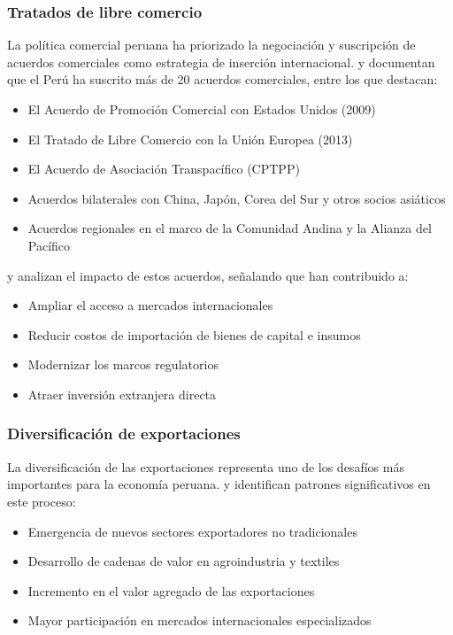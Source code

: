 \documentclass[12pt, a4paper]{article}
\begin{document}
\subsubsection{Tratados de libre comercio}
La política comercial peruana ha priorizado la negociación y suscripción de acuerdos comerciales como estrategia de inserción internacional. \cite{ferrero2018} y \cite{novak2019} documentan que el Perú ha suscrito más de 20 acuerdos comerciales, entre los que destacan:

\begin{itemize}
    \item El Acuerdo de Promoción Comercial con Estados Unidos (2009)
    \item El Tratado de Libre Comercio con la Unión Europea (2013)
    \item El Acuerdo de Asociación Transpacífico (CPTPP)
    \item Acuerdos bilaterales con China, Japón, Corea del Sur y otros socios asiáticos
    \item Acuerdos regionales en el marco de la Comunidad Andina y la Alianza del Pacífico
\end{itemize}

\cite{garcia_belaunde2020} y \cite{morales2021} analizan el impacto de estos acuerdos, señalando que han contribuido a:
\begin{itemize}
    \item Ampliar el acceso a mercados internacionales
    \item Reducir costos de importación de bienes de capital e insumos
    \item Modernizar los marcos regulatorios
    \item Atraer inversión extranjera directa
\end{itemize}

\subsubsection{Diversificación de exportaciones}
La diversificación de las exportaciones representa uno de los desafíos más importantes para la economía peruana. \cite{vasquez2018} y \cite{alarco2021} identifican patrones significativos en este proceso:

\begin{itemize}
    \item Emergencia de nuevos sectores exportadores no tradicionales
    \item Desarrollo de cadenas de valor en agroindustria y textiles
    \item Incremento en el valor agregado de las exportaciones
    \item Mayor participación en mercados internacionales especializados
\end{itemize}
\end{document}
